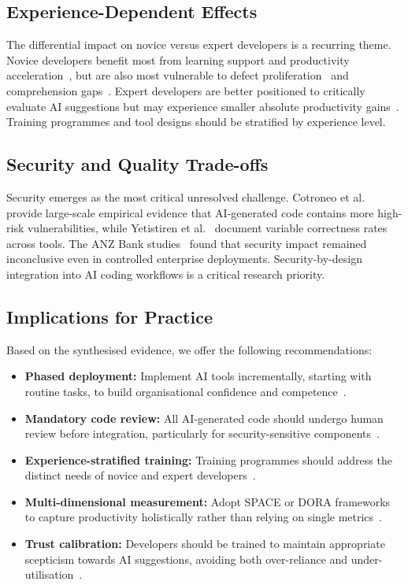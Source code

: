 \documentclass[journal,twoside,10pt]{IEEEtran}
\begin{document}
\subsection{Experience-Dependent Effects}

The differential impact on novice versus expert developers is a recurring
theme. Novice developers benefit most from learning support and productivity
acceleration~\cite{waseem2023novice,ng2024publicsector}, but are also most
vulnerable to defect proliferation~\cite{urs2025trust} and comprehension
gaps~\cite{shihab2025brownfield}. Expert developers are better positioned to
critically evaluate AI suggestions but may experience smaller absolute
productivity gains~\cite{song2024opensource}. Training programmes and tool
designs should be stratified by experience level.

\subsection{Security and Quality Trade-offs}

Security emerges as the most critical unresolved challenge. Cotroneo et
al.~\cite{cotroneo2025defects} provide large-scale empirical evidence that
AI-generated code contains more high-risk vulnerabilities, while Yetistiren et
al.~\cite{yetistiren2023quality} document variable correctness rates across
tools. The ANZ Bank studies~\cite{chatterjee2024anzcsit,chatterjee2024anzarxiv}
found that security impact remained inconclusive even in controlled enterprise
deployments. Security-by-design integration into AI coding workflows is a
critical research priority.

\subsection{Implications for Practice}

Based on the synthesised evidence, we offer the following recommendations:
\begin{itemize}
  \item \textbf{Phased deployment:} Implement AI tools incrementally, starting
        with routine tasks, to build organisational confidence and
        competence~\cite{agarwal2025corporate}.
  \item \textbf{Mandatory code review:} All AI-generated code should undergo
        human review before integration, particularly for security-sensitive
        components~\cite{cotroneo2025defects,yetistiren2023quality}.
  \item \textbf{Experience-stratified training:} Training programmes should
        address the distinct needs of novice and expert
        developers~\cite{urs2025trust,ng2024publicsector}.
  \item \textbf{Multi-dimensional measurement:} Adopt SPACE or DORA frameworks
        to capture productivity holistically rather than relying on single
        metrics~\cite{swaraj2025llm}.
  \item \textbf{Trust calibration:} Developers should be trained to maintain
        appropriate scepticism towards AI suggestions, avoiding both
        over-reliance and under-utilisation~\cite{olivares2025meta,urs2025trust}.
\end{itemize}
\end{document}
